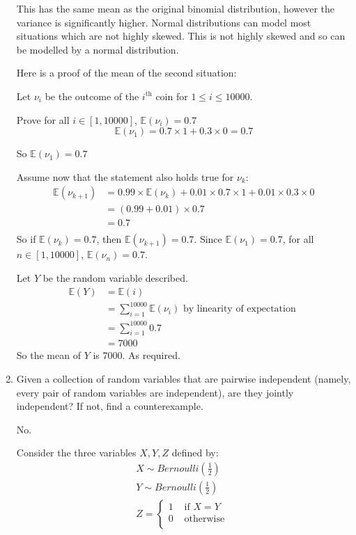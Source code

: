 \documentclass[10pt,\jkfside,a4paper]{article}
\begin{document}
\begin{enumerate}
This has the same mean as the original binomial distribution, however the variance
is significantly higher.
Normal distributions can model most situations which are not highly skewed.
This is not highly skewed and so can be modelled by a normal distribution.

Here is a proof of the mean of the second situation:

Let $\nu_i$ be the outcome of the $i^{\text{th}}$ coin for $1 \leq i \leq 10000$.

Prove for all $i \in [1, 10000]$, $\mathbb{E}(\nu_i) = 0.7$
\[
\mathbb{E}(\nu_1) = 0.7 \times 1 + 0.3 \times 0 = 0.7
\]

So $\mathbb{E}(\nu_1) = 0.7$

Assume now that the statement also holds true for $\nu_k$:
\[
\begin{split}
\mathbb{E}(\nu_{k + 1})
&= 0.99 \times \mathbb{E}(\nu_k) + 0.01 \times 0.7 \times 1 + 0.01 \times 0.3 \times 0 \\
&= (0.99 + 0.01) \times 0.7 \\
&= 0.7 \\
\end{split}
\]
So if $\mathbb{E}(\nu_k) = 0.7$, then $\mathbb{E}(\nu_{k + 1}) = 0.7$. Since $\mathbb{E}(\nu_1) = 0.7$, for all $n \in
[1, 10000]$, $\mathbb{E}(\nu_n) = 0.7$.

Let $Y$ be the random variable described.
\[
\begin{split}
\mathbb{E}(Y) &= \mathbb{E}\left( i \right) \\
&= \sum^{10000}_{i=1} \mathbb{E}(\nu_i) \text{ by linearity of expectation }\\
&= \sum^{10000}_{i=1} 0.7 \\
&= 7000
\end{split}
\]
So the mean of $Y$ is 7000. As required.

\item

Given a collection of random variables that are pairwise independent (namely,
every pair of random variables are independent), are they jointly independent?
If not, find a counterexample.

No.

Consider the three variables $X, Y, Z$ defined by:
\begin{gather*}
X \sim Bernoulli\left(\frac{1}{2}\right) \\
Y \sim Bernoulli\left( \frac{1}{2} \right) \\
Z = \begin{cases}
    1 & \text{ if } X = Y \\
    0 & \text{ otherwise } \\
    \end{cases}
\end{gather*}


\end{enumerate}
\end{document}
